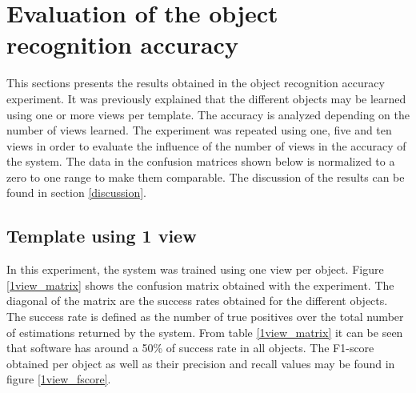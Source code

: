 \section{ Evaluation of the object recognition accuracy}
\label{results_accuracy_measurement}
This sections presents the results obtained in the object recognition accuracy experiment. 
It was previously explained that the different objects may be learned using one or more views per template. 
The accuracy is analyzed depending on the number of views learned. 
The experiment was repeated using one, five and ten views in order to evaluate the influence of the number of views in the accuracy of the system. %
The data in the confusion matrices shown below is normalized to a zero to one range to make them comparable.
The discussion of the results can be found in section \ref{discussion}.

\subsection{Template using 1 view}
In this experiment, the system was trained using one view per object. 
Figure \ref{1view_matrix} shows the confusion matrix obtained with the experiment. 
The diagonal of the matrix are the success rates obtained for the different objects. 
The success rate is defined as the number of true positives over the total number of estimations returned by the system. 
From table \ref{1view_matrix} it can be seen that software has around a 50\% of success rate in all objects.
The F1-score obtained per object as well as their precision and recall values may be found in figure \ref{1view_fscore}.


